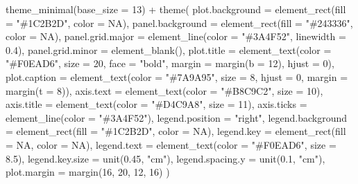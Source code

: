 \documentclass[
  letterpaper,
  DIV=11,
  numbers=noendperiod]{scrartcl}
\newenvironment{Shaded}{\begin{snugshade}}{\end{snugshade}}
\newcommand{\AttributeTok}[1]{\textcolor[rgb]{0.40,0.45,0.13}{#1}}
\newcommand{\ConstantTok}[1]{\textcolor[rgb]{0.56,0.35,0.01}{#1}}
\newcommand{\DecValTok}[1]{\textcolor[rgb]{0.68,0.00,0.00}{#1}}
\newcommand{\FloatTok}[1]{\textcolor[rgb]{0.68,0.00,0.00}{#1}}
\newcommand{\FunctionTok}[1]{\textcolor[rgb]{0.28,0.35,0.67}{#1}}
\newcommand{\NormalTok}[1]{\textcolor[rgb]{0.00,0.23,0.31}{#1}}
\newcommand{\SpecialCharTok}[1]{\textcolor[rgb]{0.37,0.37,0.37}{#1}}
\newcommand{\StringTok}[1]{\textcolor[rgb]{0.13,0.47,0.30}{#1}}
\begin{document}
\begin{Shaded}
\begin{Highlighting}[]
  \FunctionTok{theme\_minimal}\NormalTok{(}\AttributeTok{base\_size =} \DecValTok{13}\NormalTok{) }\SpecialCharTok{+}
  \FunctionTok{theme}\NormalTok{(}
    \AttributeTok{plot.background  =} \FunctionTok{element\_rect}\NormalTok{(}\AttributeTok{fill =} \StringTok{"\#1C2B2D"}\NormalTok{, }\AttributeTok{color =} \ConstantTok{NA}\NormalTok{),}
    \AttributeTok{panel.background =} \FunctionTok{element\_rect}\NormalTok{(}\AttributeTok{fill =} \StringTok{"\#243336"}\NormalTok{, }\AttributeTok{color =} \ConstantTok{NA}\NormalTok{),}
    \AttributeTok{panel.grid.major =} \FunctionTok{element\_line}\NormalTok{(}\AttributeTok{color =} \StringTok{"\#3A4F52"}\NormalTok{, }\AttributeTok{linewidth =} \FloatTok{0.4}\NormalTok{),}
    \AttributeTok{panel.grid.minor =} \FunctionTok{element\_blank}\NormalTok{(),}
    \AttributeTok{plot.title   =} \FunctionTok{element\_text}\NormalTok{(}\AttributeTok{color =} \StringTok{"\#F0EAD6"}\NormalTok{, }\AttributeTok{size =} \DecValTok{20}\NormalTok{, }\AttributeTok{face =} \StringTok{"bold"}\NormalTok{,}
                                \AttributeTok{margin =} \FunctionTok{margin}\NormalTok{(}\AttributeTok{b =} \DecValTok{12}\NormalTok{), }\AttributeTok{hjust =} \DecValTok{0}\NormalTok{),}
    \AttributeTok{plot.caption =} \FunctionTok{element\_text}\NormalTok{(}\AttributeTok{color =} \StringTok{"\#7A9A95"}\NormalTok{, }\AttributeTok{size =} \DecValTok{8}\NormalTok{, }\AttributeTok{hjust =} \DecValTok{0}\NormalTok{,}
                                \AttributeTok{margin =} \FunctionTok{margin}\NormalTok{(}\AttributeTok{t =} \DecValTok{8}\NormalTok{)),}
    \AttributeTok{axis.text    =} \FunctionTok{element\_text}\NormalTok{(}\AttributeTok{color =} \StringTok{"\#B8C9C2"}\NormalTok{, }\AttributeTok{size =} \DecValTok{10}\NormalTok{),}
    \AttributeTok{axis.title   =} \FunctionTok{element\_text}\NormalTok{(}\AttributeTok{color =} \StringTok{"\#D4C9A8"}\NormalTok{, }\AttributeTok{size =} \DecValTok{11}\NormalTok{),}
    \AttributeTok{axis.ticks   =} \FunctionTok{element\_line}\NormalTok{(}\AttributeTok{color =} \StringTok{"\#3A4F52"}\NormalTok{),}
    \AttributeTok{legend.position   =} \StringTok{"right"}\NormalTok{,}
    \AttributeTok{legend.background =} \FunctionTok{element\_rect}\NormalTok{(}\AttributeTok{fill =} \StringTok{"\#1C2B2D"}\NormalTok{, }\AttributeTok{color =} \ConstantTok{NA}\NormalTok{),}
    \AttributeTok{legend.key        =} \FunctionTok{element\_rect}\NormalTok{(}\AttributeTok{fill =} \ConstantTok{NA}\NormalTok{, }\AttributeTok{color =} \ConstantTok{NA}\NormalTok{),}
    \AttributeTok{legend.text       =} \FunctionTok{element\_text}\NormalTok{(}\AttributeTok{color =} \StringTok{"\#F0EAD6"}\NormalTok{, }\AttributeTok{size =} \FloatTok{8.5}\NormalTok{),}
    \AttributeTok{legend.key.size   =} \FunctionTok{unit}\NormalTok{(}\FloatTok{0.45}\NormalTok{, }\StringTok{"cm"}\NormalTok{),}
    \AttributeTok{legend.spacing.y  =} \FunctionTok{unit}\NormalTok{(}\FloatTok{0.1}\NormalTok{, }\StringTok{"cm"}\NormalTok{),}
    \AttributeTok{plot.margin =} \FunctionTok{margin}\NormalTok{(}\DecValTok{16}\NormalTok{, }\DecValTok{20}\NormalTok{, }\DecValTok{12}\NormalTok{, }\DecValTok{16}\NormalTok{)}
\NormalTok{  )}
\end{Highlighting}
\end{Shaded}
\end{document}

